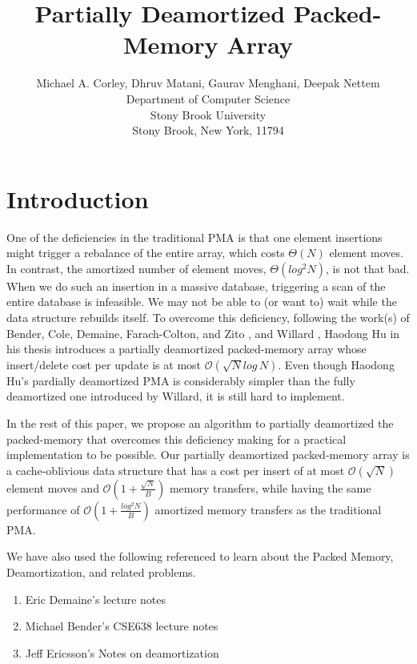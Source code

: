 \documentclass[10pt]{article}
\title{Partially Deamortized Packed-Memory Array}
\author{Michael A. Corley, Dhruv Matani, Gaurav Menghani, Deepak Nettem \\
        Department of Computer Science \\
        Stony Brook University \\
        Stony Brook, New York, 11794}
\date{}
\begin{document}
\maketitle
\bigskip

\clearpage

\section{Introduction}

One of the deficiencies in the traditional PMA is that one element
insertions might trigger a rebalance of the entire array, which costs
$\Theta(N)$ element moves. In contrast, the amortized number of
element moves, $\Theta(log^2 N)$, is not that bad. When we do such an
insertion in a massive database, triggering a scan of the entire
database is infeasible. We may not be able to (or want to) wait while
the data structure rebuilds itself. To overcome this deficiency,
following the work(s) of Bender, Cole, Demaine, Farach-Colton, and
Zito \cite{2-simplified-algorithms}, and Willard \cite{willard},
Haodong Hu in his thesis \cite{haodong-thesis} \cite{adaptive-pma}
introduces a partially deamortized packed-memory array whose
insert/delete cost per update is at most
$\mathcal{O}({\sqrt{N}log\,N})$.  Even though Haodong Hu's pardially
deamortized PMA is considerably simpler than the fully deamortized one
introduced by Willard, it is still hard to implement.

In the rest of this paper, we propose an algorithm to partially
deamortized the packed-memory that overcomes this deficiency making
for a practical implementation to be possible. Our partially
deamortized packed-memory array is a cache-oblivious data structure
that has a cost per insert of at most $\mathcal{O}(\sqrt{N})$ element
moves and $\mathcal{O}(1+ \frac{\sqrt{N}}{B})$ memory transfers, while having
the same performance of $\mathcal{O}(1+\frac{log^2{N}}{B})$ amortized memory
transfers as the traditional PMA.

We have also used the following referenced to learn about the Packed Memory, Deamortization, and related problems.

\begin{enumerate}
\item Eric Demaine's lecture notes \cite{demaine-lecture-notes}
\item Michael Bender's CSE638 lecture notes
\item Jeff Ericsson's Notes on deamortization \cite{jeffe-lecture-notes}
\end{enumerate}
\end{document}
